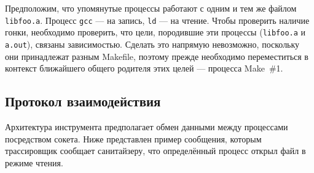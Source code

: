 Предположим, что упомянутые процессы работают с одним и тем же файлом \texttt{libfoo.a}. Процесс \texttt{gcc} --- на запись, \texttt{ld} --- на чтение. Чтобы проверить наличие гонки, необходимо проверить, что цели, породившие эти процессы (\texttt{libfoo.a} и \texttt{a.out}), связаны зависимостью. Сделать это напрямую невозможно, поскольку они принадлежат разным Makefile, поэтому прежде необходимо переместиться в контекст ближайшего общего родителя этих целей --- процесса Make~\#1.

\subsection{Протокол взаимодействия}
\label{subsec:pstree}

Архитектура инструмента предполагает обмен данными между процессами посредством сокета. Ниже представлен пример сообщения, которым трассировщик сообщает санитайзеру, что определённый процесс открыл файл в режиме чтения.

